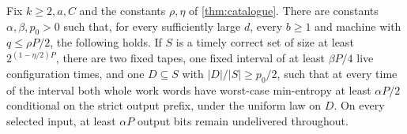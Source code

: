 \begin{theorem}\label{thm:conditional-information}
Fix $k\ge2,a,C$ and the constants $\rho,\eta$ of \cref{thm:catalogue}.
There are constants $\alpha,\beta,p_0>0$ such that, for every sufficiently
large $d$, every $b\ge1$ and machine with $q\le\rho P/2$, the following
holds. If $S$ is a timely correct set of size at least
$2^{(1-\eta/2)P}$, there are two fixed tapes, one fixed interval of at least
$\beta P/4$ live configuration times, and one $D\subseteq S$ with
$|D|/|S|\ge p_0/2$, such that at every time of the interval both whole
work words have worst-case min-entropy at least $\alpha P/2$ conditional
on the strict output prefix, under the uniform law on $D$. On every selected
input, at least $\alpha P$ output bits remain undelivered throughout.
\end{theorem}
